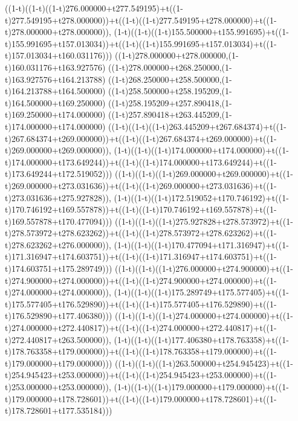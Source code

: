 ((1-t)((1-t)((1-t)276.000000+t277.549195)+t((1-t)277.549195+t278.000000))+t((1-t)((1-t)277.549195+t278.000000)+t((1-t)278.000000+t278.000000)),                                     (1-t)((1-t)((1-t)155.500000+t155.991695)+t((1-t)155.991695+t157.013034))+t((1-t)((1-t)155.991695+t157.013034)+t((1-t)157.013034+t160.031176)))
((1-t)278.000000+t278.000000,(1-t)160.031176+t163.927576)
((1-t)278.000000+t268.250000,(1-t)163.927576+t164.213788)
((1-t)268.250000+t258.500000,(1-t)164.213788+t164.500000)
((1-t)258.500000+t258.195209,(1-t)164.500000+t169.250000)
((1-t)258.195209+t257.890418,(1-t)169.250000+t174.000000)
((1-t)257.890418+t263.445209,(1-t)174.000000+t174.000000)
((1-t)((1-t)((1-t)263.445209+t267.684374)+t((1-t)267.684374+t269.000000))+t((1-t)((1-t)267.684374+t269.000000)+t((1-t)269.000000+t269.000000)),                                     (1-t)((1-t)((1-t)174.000000+t174.000000)+t((1-t)174.000000+t173.649244))+t((1-t)((1-t)174.000000+t173.649244)+t((1-t)173.649244+t172.519052)))
((1-t)((1-t)((1-t)269.000000+t269.000000)+t((1-t)269.000000+t273.031636))+t((1-t)((1-t)269.000000+t273.031636)+t((1-t)273.031636+t275.927828)),                                     (1-t)((1-t)((1-t)172.519052+t170.746192)+t((1-t)170.746192+t169.557878))+t((1-t)((1-t)170.746192+t169.557878)+t((1-t)169.557878+t170.477094)))
((1-t)((1-t)((1-t)275.927828+t278.573972)+t((1-t)278.573972+t278.623262))+t((1-t)((1-t)278.573972+t278.623262)+t((1-t)278.623262+t276.000000)),                                     (1-t)((1-t)((1-t)170.477094+t171.316947)+t((1-t)171.316947+t174.603751))+t((1-t)((1-t)171.316947+t174.603751)+t((1-t)174.603751+t175.289749)))
((1-t)((1-t)((1-t)276.000000+t274.900000)+t((1-t)274.900000+t274.000000))+t((1-t)((1-t)274.900000+t274.000000)+t((1-t)274.000000+t274.000000)),                                     (1-t)((1-t)((1-t)175.289749+t175.577405)+t((1-t)175.577405+t176.529890))+t((1-t)((1-t)175.577405+t176.529890)+t((1-t)176.529890+t177.406380)))
((1-t)((1-t)((1-t)274.000000+t274.000000)+t((1-t)274.000000+t272.440817))+t((1-t)((1-t)274.000000+t272.440817)+t((1-t)272.440817+t263.500000)),                                     (1-t)((1-t)((1-t)177.406380+t178.763358)+t((1-t)178.763358+t179.000000))+t((1-t)((1-t)178.763358+t179.000000)+t((1-t)179.000000+t179.000000)))
((1-t)((1-t)((1-t)263.500000+t254.945423)+t((1-t)254.945423+t253.000000))+t((1-t)((1-t)254.945423+t253.000000)+t((1-t)253.000000+t253.000000)),                                     (1-t)((1-t)((1-t)179.000000+t179.000000)+t((1-t)179.000000+t178.728601))+t((1-t)((1-t)179.000000+t178.728601)+t((1-t)178.728601+t177.535184)))
